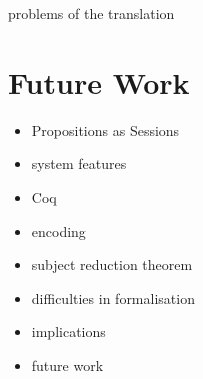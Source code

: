 \documentclass{beamer}
\begin{document}
\begin{frame}
problems of the translation
\end{frame}

\begin{comment}
the translation seems to require a duplication of the specifications for cp
and gv typing rules not done

what can we show them for the failures?

here are some issues and things learnt! -- our guidelines are all about
modularisation, representation, library reuse, automation!
\end{comment}

\section{Future Work}

\begin{frame}
\begin{itemize}
\item Propositions as Sessions
\item system features
\item Coq
\item encoding
\item subject reduction theorem
\item difficulties in formalisation
\item implications
\item future work
\end{itemize}
\end{frame}

\printbibliography
\end{document}
